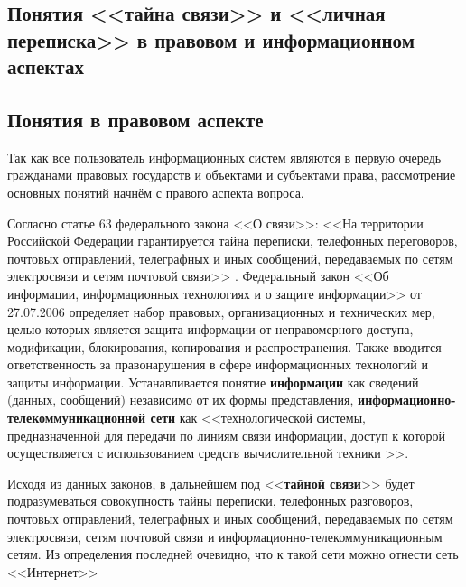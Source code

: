 \parindent=1cm %
\begin{center}
		
		\section{Понятия <<тайна связи>> и <<личная переписка>> в правовом  и информационном аспектах}
		
\end{center}
\subsection{Понятия в правовом аспекте} 

Так как все пользователь информационных систем являются в первую очередь гражданами правовых государств и объектами и субъектами права, рассмотрение основных понятий начнём с правого аспекта вопроса.

Согласно статье 63 федерального закона <<О связи>>\cite{63FZ}: %
<<На территории Российской Федерации гарантируется тайна переписки, телефонных переговоров, почтовых отправлений, телеграфных и иных сообщений, передаваемых по сетям электросвязи и сетям почтовой связи>> .
Федеральный закон <<Об информации, информационных технологиях и о защите информации>> от 27.07.2006  \cite{149FZ}
определяет набор правовых, организационных и технических мер,  целью которых является  защита информации от неправомерного доступа, модификации, блокирования, копирования и распространения. Также вводится ответственность за правонарушения в сфере информационных технологий и защиты информации.  Устанавливается понятие \textbf{информации} как сведений (данных, сообщений) независимо от их формы представления, \textbf{информационно-телекоммуникационной сети } как <<технологической системы, предназначенной для передачи по линиям связи информации, доступ к которой осуществляется с использованием средств вычислительной техники >>. 

Исходя из данных законов, в дальнейшем под <<\textbf{тайной связи}>>  будет подразумеваться совокупность тайны переписки, телефонных разговоров, почтовых отправлений, телеграфных и иных сообщений, передаваемых по сетям электросвязи, сетям почтовой связи и информационно-телекоммуникационным сетям.  Из определения последней очевидно, что к такой сети  можно отнести сеть <<Интернет>>

